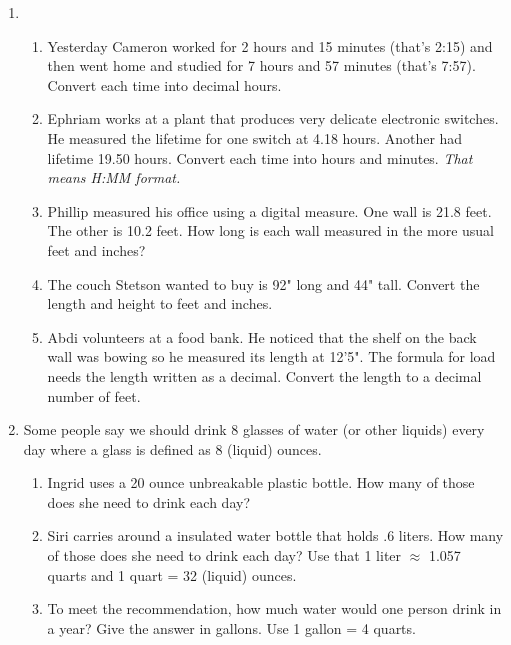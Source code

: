\begin{enumerate}
\begin{enumerate}
\end{enumerate}

\newpage %

\item \begin{enumerate}
\item Yesterday Cameron worked for 2 hours and 15 minutes (that's 2:15) and then went home and studied for 7 hours and 57 minutes (that's 7:57).  Convert each time into decimal hours. \vfill
\item  Ephriam works at a plant that produces very delicate electronic switches.  He measured the lifetime for one switch at 4.18 hours.  Another had lifetime 19.50 hours.  Convert each time into hours and minutes.   \emph{That means H:MM format.}\vfill
\item Phillip measured his office using a digital measure. One wall is 21.8 feet. The other is 10.2 feet.   How long is each wall measured in the more usual feet and inches? \vfill
\item The couch Stetson wanted to buy is 92" long and 44" tall.  Convert the length and height to feet and inches. \vfill
\item Abdi volunteers at a food bank.  He noticed that the shelf on the back wall was bowing so he measured its length at 12'5".  The formula for load needs the length written as a decimal.  Convert the length to a decimal number of feet. \vfill
\end{enumerate}

\newpage %

\item Some people say we should drink 8 glasses of water (or other liquids) every day where a glass is defined as 8 (liquid) ounces.
\begin{enumerate}
\item Ingrid uses a 20 ounce unbreakable plastic bottle.  How many of those does she need to drink each day?\vfill
\item Siri carries around a insulated water bottle that holds .6 liters.  How many of those does she need to drink each day?  Use that 1 liter $\approx$ 1.057 quarts and 1 quart = 32 (liquid) ounces.\vfill
\item To meet the recommendation, how much water would one person drink in a year?  Give the answer in gallons.  Use 1 gallon = 4 quarts.\vfill
\end{enumerate}

\newpage %


\end{enumerate}
